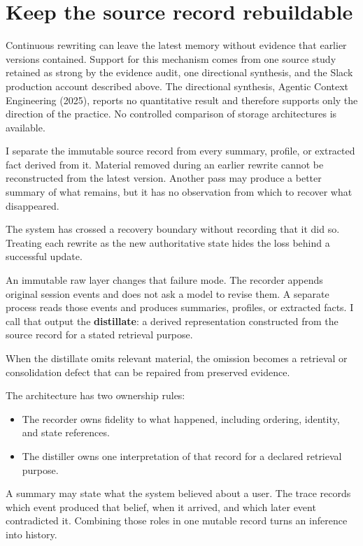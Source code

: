 \section{Keep the source record rebuildable}\label{keep-the-source-record-rebuildable}

Continuous rewriting can leave the latest memory without evidence that earlier versions contained. Support for this mechanism comes from one source study retained as strong by the evidence audit, one directional synthesis, and the Slack production account described above. The directional synthesis, Agentic Context Engineering (2025), reports no quantitative result and therefore supports only the direction of the practice. No controlled comparison of storage architectures is available.

I separate the immutable source record from every summary, profile, or extracted fact derived from it. Material removed during an earlier rewrite cannot be reconstructed from the latest version. Another pass may produce a better summary of what remains, but it has no observation from which to recover what disappeared.

The system has crossed a recovery boundary without recording that it did so. Treating each rewrite as the new authoritative state hides the loss behind a successful update.

An immutable raw layer changes that failure mode. The recorder appends original session events and does not ask a model to revise them. A separate process reads those events and produces summaries, profiles, or extracted facts. I call that output the \textbf{distillate}: a derived representation constructed from the source record for a stated retrieval purpose.

When the distillate omits relevant material, the omission becomes a retrieval or consolidation defect that can be repaired from preserved evidence.

The architecture has two ownership rules:

\begin{itemize}
\tightlist
\item
  The recorder owns fidelity to what happened, including ordering, identity, and state references.
\item
  The distiller owns one interpretation of that record for a declared retrieval purpose.
\end{itemize}

A summary may state what the system believed about a user. The trace records which event produced that belief, when it arrived, and which later event contradicted it. Combining those roles in one mutable record turns an inference into history.


